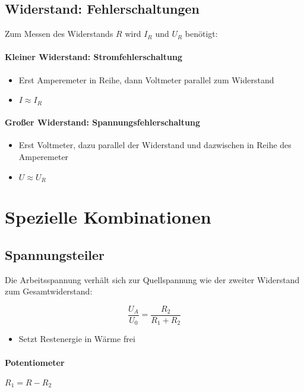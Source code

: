 \subsection{Widerstand: Fehlerschaltungen}

Zum Messen des Widerstands $R$ wird $I_R$ und $U_R$ benötigt:

\paragraph{Kleiner Widerstand: Stromfehlerschaltung}

\begin{itemize}
  \item Erst Amperemeter in Reihe, dann Voltmeter parallel zum Widerstand
  \item $I \approx I_R$
\end{itemize}

\paragraph{Gro\ss er Widerstand: Spannungsfehlerschaltung}

\begin{itemize}
  \item Erst Voltmeter, dazu parallel der Widerstand und dazwischen in Reihe des Amperemeter
  \item $U \approx U_R$
\end{itemize}

\section{Spezielle Kombinationen}

\subsection{Spannungsteiler}

Die Arbeitsspannung verhält sich zur Quellspannung wie der zweiter Widerstand zum Gesamtwiderstand:

$$\frac{U_A}{U_0} = \frac{R_2}{R_1 + R_2}$$

\begin{itemize}
  \item Setzt Restenergie in Wärme frei
\end{itemize}

\paragraph{Potentiometer} $R_1 = R - R_2$

